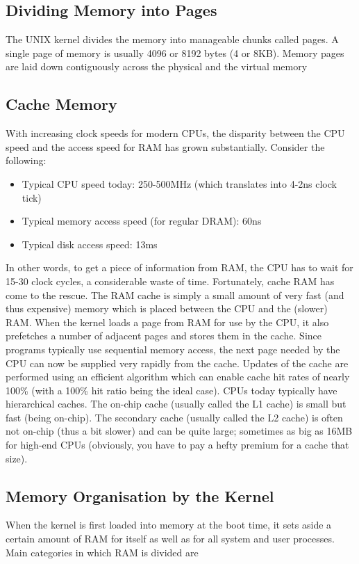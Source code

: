 \documentclass{article}
\begin{document}
 \subsection{Dividing Memory into Pages}
The UNIX kernel divides the memory into manageable chunks called pages. A single
page of memory is usually 4096 or 8192 bytes (4 or 8KB). Memory pages are laid
down contiguously across the physical and the virtual memory

\subsection{Cache Memory}
With increasing clock speeds for modern CPUs, the disparity between the CPU speed
and the access speed for RAM has grown substantially. Consider the following:
\begin{itemize}
    \item Typical CPU speed today: 250-500MHz (which translates into 4-2ns clock tick)
    \item Typical memory access speed (for regular DRAM): 60ns
    \item Typical disk access speed: 13ms
\end{itemize}
In other words, to get a piece of information from RAM, the CPU has to wait for
15-30 clock cycles, a considerable waste of time.
Fortunately, cache RAM has come to the rescue. The RAM cache is simply a small
amount of very fast (and thus expensive) memory which is placed between the CPU
and the (slower) RAM. When the kernel loads a page from RAM for use by the CPU,
it also prefetches a number of adjacent pages and stores them in the cache. Since
programs typically use sequential memory access, the next page needed by the CPU
can now be supplied very rapidly from the cache. Updates of the cache are performed
using an efficient algorithm which can enable cache hit rates of nearly 100\% (with a
100\% hit ratio being the ideal case).
CPUs today typically have hierarchical caches. The on-chip cache (usually called the
L1 cache) is small but fast (being on-chip). The secondary cache (usually called the
L2 cache) is often not on-chip (thus a bit slower) and can be quite large; sometimes as
big as 16MB for high-end CPUs (obviously, you have to pay a hefty premium for a
cache that size).

\subsection{Memory Organisation by the Kernel}
When the kernel is first loaded into memory at the boot time, it sets aside a certain
amount of RAM for itself as well as for all system and user processes. Main categories in which RAM is divided are
\end{document}
